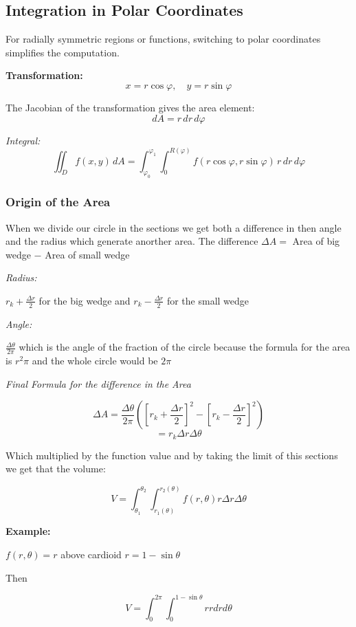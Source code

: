 \subsection{Integration in Polar Coordinates}

For radially symmetric regions or functions, switching to polar coordinates simplifies the computation.

\textbf{Transformation:}
\[
x = r \cos \varphi, \quad y = r \sin \varphi
\]

The Jacobian of the transformation gives the area element:
\[
dA = r\, dr\, d\varphi
\]


\emph{Integral:}
\[
\iint_D f(x, y)\, dA = \int_{\varphi_0}^{\varphi_1} \int_{0}^{R(\varphi)} f(r \cos \varphi, r \sin \varphi)\, r\, dr\, d\varphi
\]

\subsubsection{Origin of the Area}
When we divide our circle in the sections we get both a difference in then angle and the radius which generate anorther area.
The difference \(\Delta A =\) Area of big wedge \(-\) Area of small wedge

\emph{Radius: }

\(r_k + \frac{\Delta r}{2}\) for the big wedge and \(r_k - \frac{\Delta r}{2}\) for the small wedge

\emph{Angle: }

\(\frac{\Delta \theta}{2 \pi}\) which is the angle of the fraction of the circle because the formula for the area is \(r^2 \pi\)
and the whole circle would be \(2\pi\)

\emph{Final Formula for the difference in the Area}

\[\Delta A = \frac{\Delta \theta}{2 \pi} \left ( \left[r_k + \frac{\Delta r}{2}\right]^2 - \left[r_k - \frac{\Delta r}{2}\right]^2\right)\] 
\[ = r_k \Delta r \Delta \theta\]

Which multiplied by the function value and by taking the limit of this sections we get that the volume:

\[
V = \int_{\theta_1}^{\theta_2} \int_{r_1 (\theta)}^{r_2 (\theta)} f(r, \theta) r \Delta r \Delta \theta
\]

\textbf{Example:}

\(f(r, \theta) = r\) above cardioid \(r = 1 - \sin \theta\)

Then

\[
V = \int_{0}^{2\pi}\int_{0}^{1 - \sin \theta} r r dr d\theta
\]

